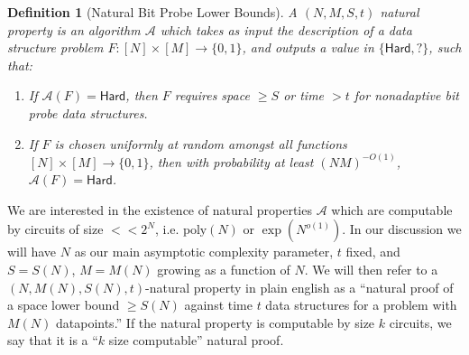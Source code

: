 \documentclass[11pt]{article}
\newtheorem{definition}{Definition}
\newcommand{\B}{\{0,1\}}
\newcommand{\poly}{\mathrm{poly}}
\begin{document}
\begin{definition}[Natural Bit Probe Lower Bounds]\label{def:natural-props}
A $(N,M,S,t)$ natural property is an algorithm $\mathcal{A}$ which takes as input the description of a data structure problem $F: [N] \times [M] \to \B$, and outputs a value in $\{\mathsf{Hard}, \mathsf{?}\}$, such that:
\begin{enumerate}
    \item If $\mathcal{A}(F) = \mathsf{Hard}$, then $F$ requires space $\geq S$ or time $>t$ for nonadaptive bit probe data structures. 
    \item If $F$ is chosen uniformly at random amongst all functions $[N] \times [M] \to \B$, then with probability at least $(NM)^{-O(1)}$, $\mathcal{A}(F) = \mathsf{Hard}$.
\end{enumerate}
\end{definition}
We are interested in the existence of natural properties $\mathcal{A}$ which are computable by circuits of size $<< 2^N$, i.e. $\poly(N)$ or $\exp(N^{o(1)})$. In our discussion we will have $N$ as our main asymptotic complexity parameter, $t$ fixed, and $S = S(N)$, $M = M(N)$ growing as a function of $N$. We will then refer to a $(N,M(N),S(N),t)$-natural property in plain english as a ``natural proof of a space lower bound $\geq S(N)$ against time $t$ data structures for a problem with $M(N)$ datapoints.'' 
If the natural property is computable by size $k$ circuits, we say that it is a ``$k$ size computable'' natural proof. 
\end{document}
